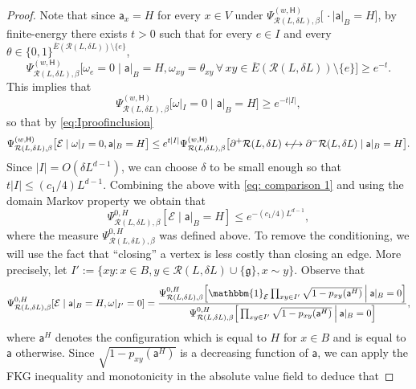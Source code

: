 \documentclass[11pt,a4paper]{article}
\numberwithin{equation}{section}
\theoremstyle{plain}
\theoremstyle{definition}
\begin{document}
\begin{proof}
Note that since $\mathsf{a}_x=H$ for every $x\in V$ under $\Psi^{(w,\mathsf{H})}_{\mathcal R(L,\delta L),\beta}\big[\, \cdot \mid \mathsf a|_B=H \big]$, by finite-energy there exists $t>0$ such that for every $e\in I$ and every $\theta\in \{0,1\}^{\overline{E}(\mathcal{R}(L,\delta L))\setminus \{e\}}$,
\begin{equation}
\Psi^{(w,\mathsf{H})}_{\mathcal R(L,\delta L),\beta}\big[\omega_e=0 \mid \mathsf a|_B=H,  \omega_{xy}=\theta_{xy} \, \forall \, xy \in \overline{E}(\mathcal{R}(L,\delta L))\setminus \{e\}\big]\geq e^{-t}.    
\end{equation}
This implies that 
\begin{equation}
\Psi^{(w,\mathsf{H})}_{\mathcal R(L,\delta L),\beta}\big[\omega|_{I}=0 \mid \mathsf a|_B=H\big]\geq e^{-t |I|},   
\end{equation}
so that by \eqref{eq:Iproofinclusion}
\begin{equation}
\Psi^{(w,\mathsf{H})}_{\mathcal R(L,\delta L),\beta}\big[\mathcal{E} \mid \omega|_{I}=0 ,\mathsf a|_B=H\big]\leq e^{t |I|} \Psi^{(w,\mathsf{H})}_{\mathcal R(L,\delta L),\beta}\big[\partial^+ \mathcal R(L, \delta L)\centernot\longleftrightarrow \partial^- \mathcal R(L, \delta L) \mid \mathsf a|_B=H\big].
\end{equation}
Since $|I|=O(\delta L^{d-1})$, we can choose $\delta$ to be small enough so that $t|I|\leq (c_1/4) L^{d-1}$. Combining the above with \eqref{eq: comparison 1} and using the domain Markov property we obtain that 
\begin{equation}\label{eq: comparison 2}
\Psi^{0,H}_{\mathcal{R}(L,\delta L),\beta}[\mathcal{E} \mid \mathsf{a}|_B=H]\leq e^{-(c_1/4) L^{d-1}},   
\end{equation}
where the measure $\Psi^{0,H}_{\mathcal{R}(L,\delta L),\beta}$ was defined above.
To remove the conditioning, we will use the fact that ``closing'' a vertex is less costly than closing an edge. More precisely, let $I':=\{xy: x\in B, y\in\mathcal{R}(L,\delta L)\cup \{\mathfrak{g}\}, x\sim y\}$. Observe that
\begin{equation}
\Psi^{0,H}_{\mathcal{R}(L,\delta L),\beta}[\mathcal{E} \mid \mathsf{a}|_B=H, \omega|_{I'}=0]=\frac{\Psi^{0,H}_{\mathcal{R}(L,\delta L),\beta}\Big[\mathbbm{1}_\mathcal{E} \prod_{xy\in I'}\sqrt{1-p_{xy}(\mathsf{a}^H)}\:\Big|\:\mathsf{a}|_B=0\Big]}{\Psi^{0,H}_{\mathcal{R}(L,\delta L),\beta}\Big[\prod_{xy\in I'}\sqrt{1-p_{xy}(\mathsf{a}^H)}\:\Big|\: \mathsf{a}|_B=0\Big]},   
\end{equation}
where $\mathsf{a}^H$ denotes the configuration which is equal to $H$ for $x\in B$ and is equal to $\mathsf{a}$ otherwise. Since $\sqrt{1-p_{xy}(\mathsf{a}^H)}$ is a decreasing function of $\mathsf{a}$, we can apply the FKG inequality and monotonicity in the absolute value field to deduce that 

\end{proof}
\end{document}
